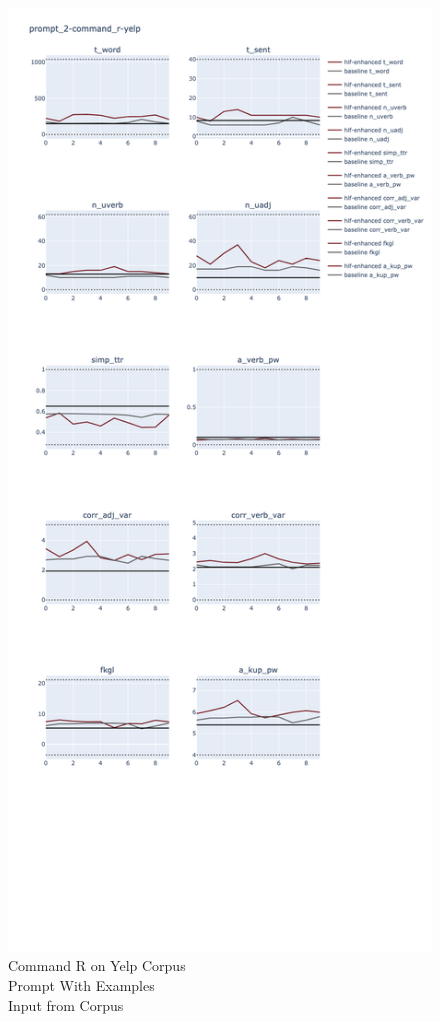 \documentclass[11pt]{article}
\begin{document}
\begin{figure}[ht]
    \includegraphics[width=\textwidth,height=0.9\textheight,scale=1]{plots/prompt_2_ifd/prompt_2-command_r-yelp/prompt_2-command_r-yelp.png}
    \caption{Command R on Yelp Corpus\\Prompt With Examples\\Input from Corpus}\label{fig:command_r-prompt2-yelp-ifd}
\end{figure}
\end{document}
